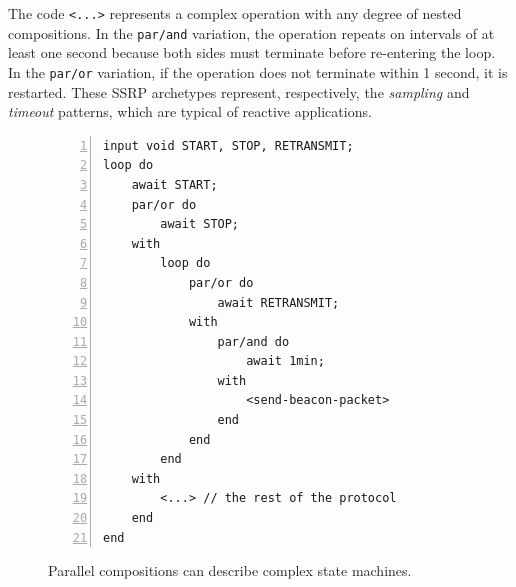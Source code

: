 \documentclass[preprint]{sigplanconf}
\newcommand{\code}[1] {{\small{\texttt{#1}}}}
\newcommand{\1}{\;}
\newcommand{\2}{\;\;}
\newcommand{\3}{\;\;\;}
\newcommand{\5}{\;\;\;\;\;}
\begin{document}
The code \code{<...>} represents a complex operation with any degree of nested 
compositions.
%
In the \code{par/and} variation, the operation repeats on intervals of at least 
one second because both sides must terminate before re-entering the loop.
In the \code{par/or} variation, if the operation does not terminate within 1 
second, it is restarted.
%
These SSRP archetypes represent, respectively, the \emph{sampling} and 
\emph{timeout} patterns, which are typical of reactive applications.


\begin{figure}%
\begin{lstlisting}[numbers=left,xleftmargin=3em]
input void START, STOP, RETRANSMIT;
loop do
    await START;
    par/or do
        await STOP;
    with
        loop do
            par/or do
                await RETRANSMIT;
            with
                par/and do
                    await 1min;
                with
                    <send-beacon-packet>
                end
            end
        end
    with
        <...> // the rest of the protocol
    end
end
\end{lstlisting}
\caption{ Parallel compositions can describe complex state machines.
\label{lst.ctp}
}
\end{figure}
\end{document}
